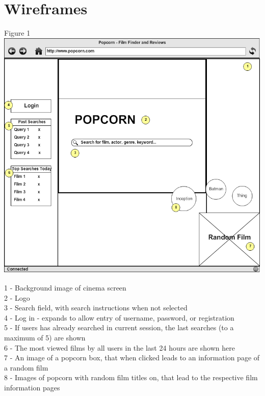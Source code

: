 \documentclass{sig-alt-release2}
\begin{document}
%
%

\appendix
\section{Wireframes}
Figure 1\\
\includegraphics[scale=0.3]{wireframe1.png}
 
1 - Background image of cinema screen \\
2 - Logo \\
3 - Search field, with search instructions when not selected \\
4 - Log in - expands to allow entry of username, password, or registration \\
5 - If users has already searched in current session, the last searches (to a maximum of 5) are shown \\
6 - The most viewed films by all users in the last 24 hours are shown here \\
7 - An image of a popcorn box, that when clicked leads to an information page of a random film \\
8 - Images of popcorn with random film titles on, that lead to the respective film information pages\\
\end{document}
